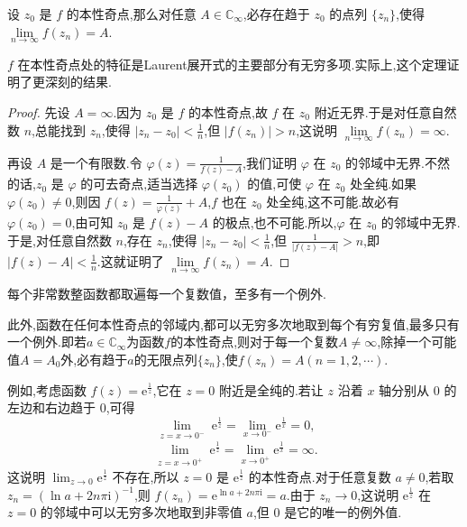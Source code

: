 \documentclass[../../main.tex]{subfiles}%
\begin{document}
\begin{theorem}[Weierstrass定理]\label{theorem:Weierstrass-定理5.2.5}
设 \( z_0 \) 是 \( f \) 的本性奇点,那么对任意 \( A \in \mathbb{C}_{\infty} \),必存在趋于 \( z_0 \) 的点列 \( \{ z_n \} \),使得 \( \lim\limits_{n \to \infty} f(z_n) = A \).
\end{theorem}
\begin{remark}
\( f \) 在本性奇点处的特征是Laurent展开式的主要部分有无穷多项.实际上,这个定理证明了更深刻的结果.
\end{remark}
\begin{proof}

先设 \( A = \infty \).因为 \( z_0 \) 是 \( f \) 的本性奇点,故 \( f \) 在 \( z_0 \) 附近无界.于是对任意自然数 \( n \),总能找到 \( z_n \),使得 \( |z_n - z_0| < \frac{1}{n} \),但 \( |f(z_n)| > n \),这说明 \( \lim\limits_{n \to \infty} f(z_n) = \infty \).

再设 \( A \) 是一个有限数.令 \( \varphi(z) = \frac{1}{f(z) - A} \),我们证明 \( \varphi \) 在 \( z_0 \) 的邻域中无界.不然的话,\( z_0 \) 是 \( \varphi \) 的可去奇点,适当选择 \( \varphi(z_0) \) 的值,可使 \( \varphi \) 在 \( z_0 \) 处全纯.如果 \( \varphi(z_0) \neq 0 \),则因 \( f(z) = \frac{1}{\varphi(z)} + A \),\( f \) 也在 \( z_0 \) 处全纯,这不可能.故必有 \( \varphi(z_0) = 0 \),由可知 \( z_0 \) 是 \( f(z) -A\) 的极点,也不可能.所以,\( \varphi \) 在 \( z_0 \) 的邻域中无界.于是,对任意自然数 \( n \),存在 \( z_n \),使得 \( |z_n - z_0| < \frac{1}{n} \),但 \( \frac{1}{|f(z) - A|} > n \),即 \( |f(z) - A| < \frac{1}{n} \).这就证明了 \( \lim\limits_{n \to \infty} f(z_n) = A \).

\end{proof}

\begin{theorem}[Picard定理]\label{ theorem:Picard定理-定理5.2.6}
每个非常数整函数都取遍每一个复数值，至多有一个例外.

此外,函数在任何本性奇点的邻域内,都可以无穷多次地取到每个有穷复值,最多只有一个例外.即若$a\in \mathbb{C}_{\infty}$为函数$f$的本性奇点,则对于每一个复数$A\neq \infty$,除掉一个可能值$A=A_0$外,必有趋于$a$的无限点列$\{z_n\}$,使$f(z_n)=A(n=1,2,\cdots)$.
\end{theorem}
\begin{remark}
例如,考虑函数 \( f(z) = \mathrm{e}^{\frac{1}{z}} \),它在 \( z = 0 \) 附近是全纯的.若让 \( z \) 沿着 \( x \) 轴分别从 \( 0 \) 的左边和右边趋于 \( 0 \),可得
\[
\lim_{\substack{z = x \to 0^-}} \mathrm{e}^{\frac{1}{z}} = \lim_{x \to 0^-} \mathrm{e}^{\frac{1}{x}} = 0,
\]
\[
\lim_{\substack{z = x \to 0^+}} \mathrm{e}^{\frac{1}{z}} = \lim_{x \to 0^+} \mathrm{e}^{\frac{1}{x}} = \infty.
\]
这说明 \( \lim_{z \to 0} \mathrm{e}^{\frac{1}{z}} \) 不存在,所以 \( z = 0 \) 是 \( \mathrm{e}^{\frac{1}{z}} \) 的本性奇点.对于任意复数 \( a \neq 0 \),若取 \( z_n = (\ln a + 2n\pi \mathrm{i})^{-1} \),则 \( f(z_n) = \mathrm{e}^{\ln a + 2n\pi \mathrm{i}} = a \).由于 \( z_n \to 0 \),这说明 \( \mathrm{e}^{\frac{1}{z}} \) 在 \( z = 0 \) 的邻域中可以无穷多次地取到非零值 \( a \),但 \( 0 \) 是它的唯一的例外值.
\end{remark}
\end{document}
